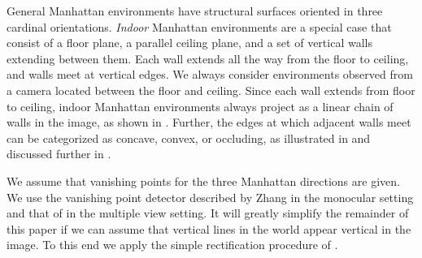 
General Manhattan environments have structural surfaces oriented in
three cardinal orientations. \textit{Indoor} Manhattan environments
are a special case that consist of a floor plane, a parallel ceiling
plane, and a set of vertical walls extending between them. Each wall
extends all the way from the floor to ceiling, and walls meet at
vertical edges. We always consider environments observed from a camera
located between the floor and ceiling. Since each wall extends from
floor to ceiling, indoor Manhattan environments always project
as a linear chain of walls in the image, as shown in
. Further, the edges at which adjacent walls meet
can be categorized as concave, convex, or occluding, as illustrated in
 and discussed further in \cite{Lee09}.

We assume that vanishing points for the three Manhattan directions are
given. We use the vanishing point detector described by Zhang \etal
\cite{Zhang02} in the monocular setting and that of \cite{FlintCVPR10} in
the multiple view setting. It will greatly simplify the remainder of
this paper if we can assume that vertical lines in the world appear
vertical in the image. To this end we apply the simple rectification
procedure of \cite{FlintCVPR10}.

